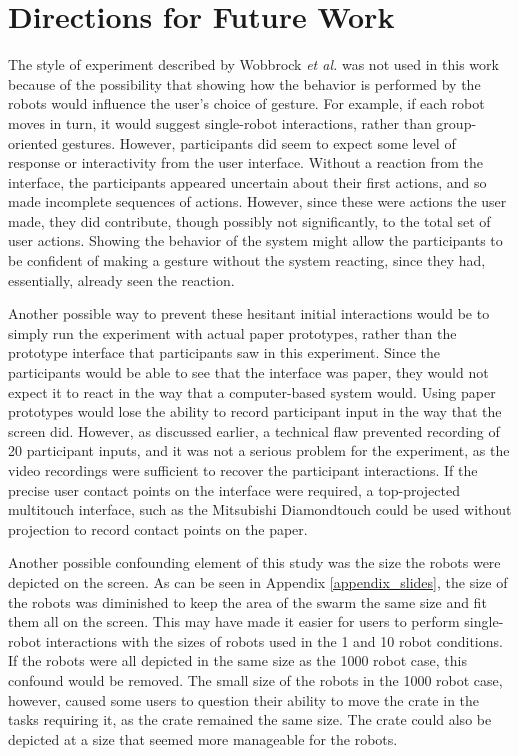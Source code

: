 \chapter{Directions for Future Work} \label{chapter:Future_work}
\thispagestyle{fancy}

The style of experiment described by Wobbrock \emph{et al.} was not used in this work because of the possibility that showing how the behavior is performed by the robots would influence the user's choice of gesture. 
For example, if each robot moves in turn, it would suggest single-robot interactions, rather than group-oriented gestures. 
However, participants did seem to expect some level of response or interactivity from the user interface. 
Without a reaction from the interface, the participants appeared uncertain about their first actions, and so made incomplete sequences of actions. 
However, since these were actions the user made, they did contribute, though possibly not significantly, to the total set of user actions.
Showing the behavior of the system might allow the participants to be confident of making a gesture without the system reacting, since they had, essentially, already seen the reaction. 

Another possible way to prevent these hesitant initial interactions would be to simply run the experiment with actual paper prototypes, rather than the prototype interface that participants saw in this experiment. 
Since the participants would be able to see that the interface was paper, they would not expect it to react in the way that a computer-based system would. 
Using paper prototypes would lose the ability to record participant input in the way that the screen did. 
However, as discussed earlier, a technical flaw prevented recording of 20 participant inputs, and it was not a serious problem for the experiment, as the video recordings were sufficient to recover the participant interactions. 
If the precise user contact points on the interface were required, a top-projected multitouch interface, such as the Mitsubishi Diamondtouch could be used without projection to record contact points on the paper. 
	
Another possible confounding element of this study was the size the robots were depicted on the screen.
As can be seen in Appendix \ref{appendix_slides}, the size of the robots was diminished to keep the area of the swarm the same size and fit them all on the screen. 
This may have made it easier for users to perform single-robot interactions with the sizes of robots used in the 1 and 10 robot conditions. 
If the robots were all depicted in the same size as the 1000 robot case, this confound would be removed. 
The small size of the robots in the 1000 robot case, however, caused some users to question their ability to move the crate in the tasks requiring it, as the crate remained the same size.
The crate could also be depicted at a size that seemed more manageable for the robots.  

